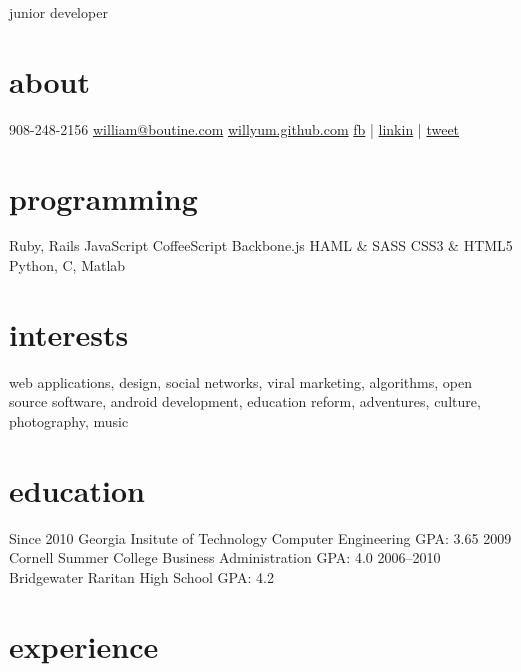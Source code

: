 \documentclass[]{cv}
\begin{document}
       {junior developer}

\begin{aside}
  \section{about}
     908-248-2156
    \href{mailto:william@boutine.com}{william@boutine.com}
    \href{http://willyum.github.com}{willyum.github.com}
    \href{http://facebook.com/kingwillah}{fb} | \href{http://www.linkedin.com/profile/view?id=158614185}{linkin} | \href{https://twitter.com/#!/wking124}{tweet}
  \section{programming}
    Ruby, Rails
    JavaScript
    CoffeeScript
    Backbone.js
    HAML \& SASS
    CSS3 \& HTML5
    Python, C, Matlab
\end{aside}

\section{interests}

web applications, design, social networks, viral marketing, algorithms, open source software, android development, education reform, adventures, culture, photography, music

\section{education}

\begin{entrylist}
  \entry
    {Since 2010}
    {Georgia Insitute of Technology}
    {Computer Engineering}
    {GPA: 3.65\newline}
  \entry
    {2009}
    {Cornell Summer College}
    {Business Administration}
    {GPA: 4.0\newline}
  \entry
    {2006–2010}
    {Bridgewater Raritan High School}
    {}
    {GPA: 4.2\newline}
\end{entrylist}

\section{experience}
\end{document}
